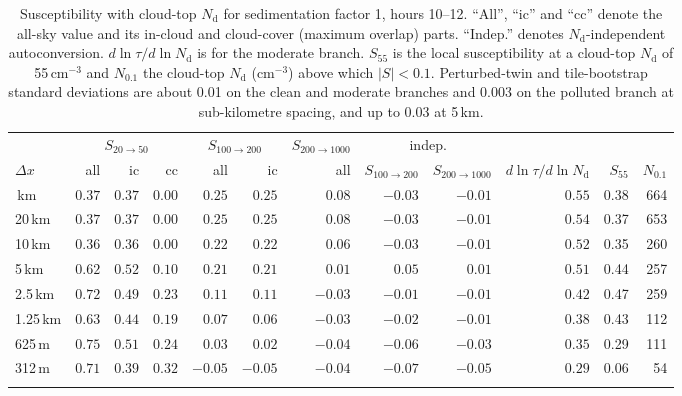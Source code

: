 \documentclass[acp, manuscript]{copernicus}
\newcommand{\Nd}{N_\mathrm{d}}
\newcommand{\dx}{\Delta x}
\newcommand{\Slow}{S_{20\rightarrow50}}
\newcommand{\Shigh}{S_{100\rightarrow200}}
\newcommand{\Svhigh}{S_{200\rightarrow1000}}
\newcommand{\cmthree}{\mathrm{cm^{-3}}}
\begin{document}
\begin{table}[t]
\caption{Susceptibility with cloud-top $\Nd$ for sedimentation factor 1, hours 10--12. ``All'', ``ic'' and ``cc'' denote the all-sky value and its in-cloud and cloud-cover (maximum overlap) parts. ``Indep.'' denotes $\Nd$-independent autoconversion. $d\ln\tau/d\ln\Nd$ is for the moderate branch. $S_{55}$ is the local susceptibility at a cloud-top $\Nd$ of 55\,$\cmthree$ and $N_{0.1}$ the cloud-top $\Nd$ ($\cmthree$) above which $|S|<0.1$. Perturbed-twin and tile-bootstrap standard deviations are about 0.01 on the clean and moderate branches and 0.003 on the polluted branch at sub-kilometre spacing, and up to 0.03 at 5\,km.}\label{tab:S}
\begin{tabular}{lrrrrrrrrrrr}
\tophline
 & \multicolumn{3}{c}{$\Slow$} & \multicolumn{2}{c}{$\Shigh$} & $\Svhigh$ & \multicolumn{2}{c}{indep.} & & & \\
$\dx$ & all & ic & cc & all & ic & all & $\Shigh$ & $\Svhigh$ & $d\ln\tau/d\ln\Nd$ & $S_{55}$ & $N_{0.1}$ \\
\middlehline
40\,km & $0.37$ & $0.37$ & $0.00$ & $0.25$ & $0.25$ & $0.08$ & $-0.03$ & $-0.01$ & $0.55$ & 0.38 & 664 \\
20\,km & $0.37$ & $0.37$ & $0.00$ & $0.25$ & $0.25$ & $0.08$ & $-0.03$ & $-0.01$ & $0.54$ & 0.37 & 653 \\
10\,km & $0.36$ & $0.36$ & $0.00$ & $0.22$ & $0.22$ & $0.06$ & $-0.03$ & $-0.01$ & $0.52$ & 0.35 & 260 \\
5\,km & $0.62$ & $0.52$ & $0.10$ & $0.21$ & $0.21$ & $0.01$ & $0.05$ & $0.01$ & $0.51$ & 0.44 & 257 \\
2.5\,km & $0.72$ & $0.49$ & $0.23$ & $0.11$ & $0.11$ & $-0.03$ & $-0.01$ & $-0.01$ & $0.42$ & 0.47 & 259 \\
1.25\,km & $0.63$ & $0.44$ & $0.19$ & $0.07$ & $0.06$ & $-0.03$ & $-0.02$ & $-0.01$ & $0.38$ & 0.43 & 112 \\
625\,m & $0.75$ & $0.51$ & $0.24$ & $0.03$ & $0.02$ & $-0.04$ & $-0.06$ & $-0.03$ & $0.35$ & 0.29 & 111 \\
312\,m & $0.71$ & $0.39$ & $0.32$ & $-0.05$ & $-0.05$ & $-0.04$ & $-0.07$ & $-0.05$ & $0.29$ & 0.06 & 54 \\
\bottomhline

\end{tabular}
\end{table}
\end{document}
